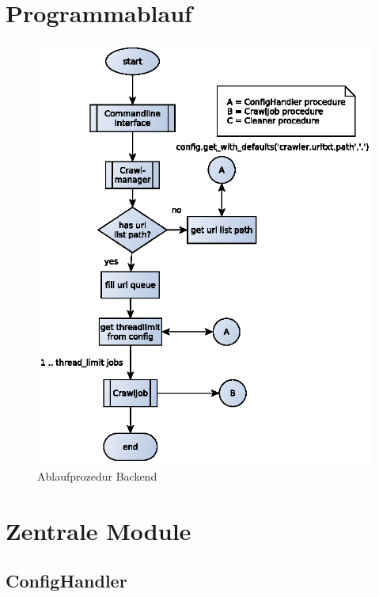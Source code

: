 \section{Programmablauf} 
\label{sec:programmablauf}
\begin{figure}[h!]
\centering
\label{dia:design:backend:overview}
\includegraphics[width=\textwidth]{design/backend/gfx/backend_procedure.eps}
\caption{Ablaufprozedur Backend}
\end{figure}


\newpage
\section{Zentrale Module} 
\label{sec:zentrale_module}

\subsection{ConfigHandler}

